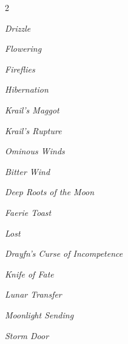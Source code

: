 \documentclass[10pt,a4paper,twoside,bg=print,twocolumn,openany,nodeprecatedcode]{dndbook}
\begin{document}
\begin{description}
\begin{multicols}{2}
{\par \vspace { 9pt plus 3pt minus 3pt } \noindent  {} \nopagebreak }

\begin{description}
\item \textit{Drizzle}
\item \textit{Flowering}
\end{description}

{\par \vspace { 9pt plus 3pt minus 3pt } \noindent  {} \nopagebreak }

\begin{description}
\item \textit{Fireflies}
\end{description}

{\par \vspace { 9pt plus 3pt minus 3pt } \noindent  {} \nopagebreak }

\begin{description}
\item \textit{Hibernation}
\item \textit{Krail's Maggot}
\item \textit{Krail's Rupture}
\item \textit{Ominous Winds}
\end{description}

{\par \vspace { 9pt plus 3pt minus 3pt } \noindent  {} \nopagebreak }

\begin{description}
\item \textit{Bitter Wind}
\item \textit{Deep Roots of the Moon}
\item \textit{Faerie Toast}
\item \textit{Lost}
\end{description}

{\par \vspace { 9pt plus 3pt minus 3pt } \noindent  {} \nopagebreak }

\begin{description}
\item \textit{Drayfn's Curse of Incompetence}
\item \textit{Knife of Fate}
\item \textit{Lunar Transfer}
\item \textit{Moonlight Sending}
\item \textit{Storm Door}
\end{description}


\end{multicols}
\end{description}
\end{document}
